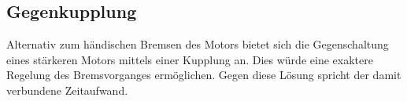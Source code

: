 \subsection{Gegenkupplung}
\label{gegenkupplung}

Alternativ zum händischen Bremsen des Motors bietet sich die Gegenschaltung eines stärkeren Motors mittels einer Kupplung an.
Dies würde eine exaktere Regelung des Bremsvorganges ermöglichen.
Gegen diese Lösung spricht der damit verbundene Zeitaufwand.